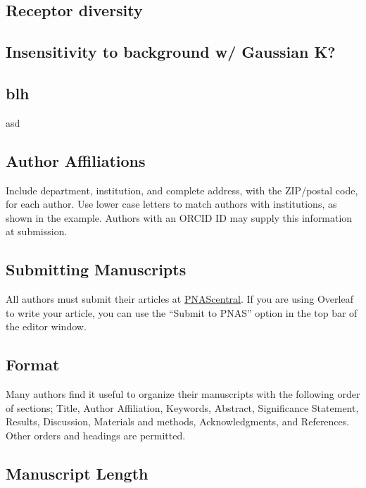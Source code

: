 \documentclass[9pt,twocolumn,twoside]{pnas-new}
\begin{document}
\subsection*{Receptor diversity }

\subsection*{Insensitivity to background w/ Gaussian K?}





\subsection*{blh}

asd
\subsection*{Author Affiliations}

Include department, institution, and complete address, with the ZIP/postal code, for each author. Use lower case letters to match authors with institutions, as shown in the example. Authors with an ORCID ID may supply this information at submission.

\subsection*{Submitting Manuscripts}

All authors must submit their articles at \href{http://www.pnascentral.org/cgi-bin/main.plex}{PNAScentral}. If you are using Overleaf to write your article, you can use the ``Submit to PNAS'' option in the top bar of the editor window. 

\subsection*{Format}

Many authors find it useful to organize their manuscripts with the following order of sections;  Title, Author Affiliation, Keywords, Abstract, Significance Statement, Results, Discussion, Materials and methods, Acknowledgments, and References. Other orders and headings are permitted.

\subsection*{Manuscript Length}
\end{document}
